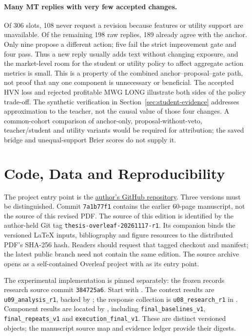 \paragraph{Many MT replies with very few accepted changes.}
Of 306 slots, 108 never request a revision because features or utility
support are unavailable. Of the remaining 198 raw replies, 189 already
agree with the anchor. Only nine propose a different action; five fail
the strict improvement gate and four pass. Thus a new reply usually
adds text without changing exposure, and the market-level room for the
student or utility policy to affect aggregate action metrics is small.
This is a property of the combined anchor--proposal--gate path, not proof
that any one component is unnecessary or beneficial. The accepted HVN
loss and rejected profitable MWG LONG illustrate both sides of the
policy trade-off. The synthetic verification in
Section~\ref{sec:student-evidence} addresses approximation to the teacher,
not the causal value of those four changes. A common-cohort comparison
of anchor-only, proposal-without-veto, teacher/student and utility variants
would be required for attribution; the saved bridge and unequal-support
Brier scores do not supply it.

\section{Code, Data and Reproducibility}\label{sec:reproducibility}
The project entry point is the
\href{https://github.com/DungPhanHoangg05/A-Multi-Agent-Large-Language-Model-Approach-to-Price-Driven-Stock-Trading-in-the-Vietnamese-Stock-Ma}{author's GitHub repository}.
Three versions must be distinguished. Commit \texttt{7a1b77f1} contains
the earlier 60-page manuscript, not the source of this revised PDF.
The source of this edition is identified by the author-held Git tag
\texttt{thesis-overleaf-20261117-r1}. Its companion
 binds the versioned LaTeX inputs,
bibliography and figure resources to the distributed PDF's SHA-256 hash.
Readers should request that tagged checkout and manifest; the latest
public branch need not contain the same edition. The source archive opens
as a self-contained Overleaf project with  as its entry point.

The experimental implementation is pinned separately: the frozen
 records research
source commit \texttt{384725a6}. Start with
. The context results are
\texttt{u09\_analysis\_r1}, backed by
; the response
collection is \texttt{u08\_research\_r1} in
. Component results are located by
, including
\texttt{final\_baselines\_v1}, \texttt{final\_repeats\_v1} and
\texttt{execution\_final\_v1}. These are distinct versioned objects;
the manuscript source map and evidence ledger provide their digests.

